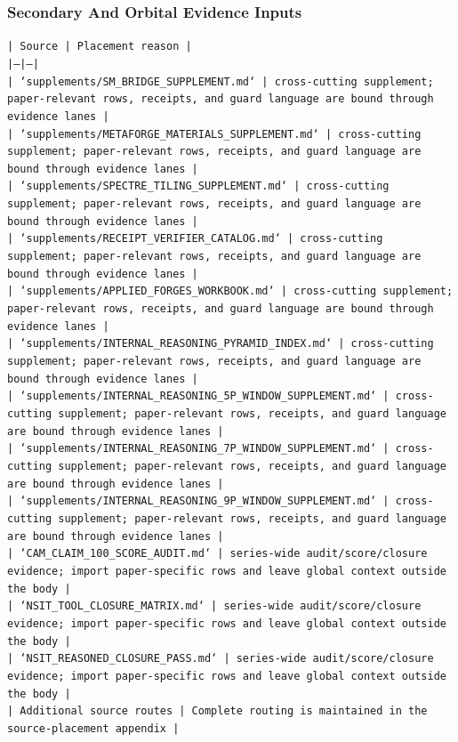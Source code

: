 \documentclass[11pt]{article}
\begin{document}
\subsubsection*{Secondary And Orbital Evidence Inputs}

\noindent\texttt{| Source | Placement reason |}\\
\noindent\texttt{|---|---|}\\
\noindent\texttt{| `supplements/SM\_BRIDGE\_SUPPLEMENT.md` | cross-cutting supplement; paper-relevant rows, receipts, and guard language are bound through evidence lanes |}\\
\noindent\texttt{| `supplements/METAFORGE\_MATERIALS\_SUPPLEMENT.md` | cross-cutting supplement; paper-relevant rows, receipts, and guard language are bound through evidence lanes |}\\
\noindent\texttt{| `supplements/SPECTRE\_TILING\_SUPPLEMENT.md` | cross-cutting supplement; paper-relevant rows, receipts, and guard language are bound through evidence lanes |}\\
\noindent\texttt{| `supplements/RECEIPT\_VERIFIER\_CATALOG.md` | cross-cutting supplement; paper-relevant rows, receipts, and guard language are bound through evidence lanes |}\\
\noindent\texttt{| `supplements/APPLIED\_FORGES\_WORKBOOK.md` | cross-cutting supplement; paper-relevant rows, receipts, and guard language are bound through evidence lanes |}\\
\noindent\texttt{| `supplements/INTERNAL\_REASONING\_PYRAMID\_INDEX.md` | cross-cutting supplement; paper-relevant rows, receipts, and guard language are bound through evidence lanes |}\\
\noindent\texttt{| `supplements/INTERNAL\_REASONING\_5P\_WINDOW\_SUPPLEMENT.md` | cross-cutting supplement; paper-relevant rows, receipts, and guard language are bound through evidence lanes |}\\
\noindent\texttt{| `supplements/INTERNAL\_REASONING\_7P\_WINDOW\_SUPPLEMENT.md` | cross-cutting supplement; paper-relevant rows, receipts, and guard language are bound through evidence lanes |}\\
\noindent\texttt{| `supplements/INTERNAL\_REASONING\_9P\_WINDOW\_SUPPLEMENT.md` | cross-cutting supplement; paper-relevant rows, receipts, and guard language are bound through evidence lanes |}\\
\noindent\texttt{| `CAM\_CLAIM\_100\_SCORE\_AUDIT.md` | series-wide audit/score/closure evidence; import paper-specific rows and leave global context outside the body |}\\
\noindent\texttt{| `NSIT\_TOOL\_CLOSURE\_MATRIX.md` | series-wide audit/score/closure evidence; import paper-specific rows and leave global context outside the body |}\\
\noindent\texttt{| `NSIT\_REASONED\_CLOSURE\_PASS.md` | series-wide audit/score/closure evidence; import paper-specific rows and leave global context outside the body |}\\
\noindent\texttt{| Additional source routes | Complete routing is maintained in the source-placement appendix |}\\
\end{document}
